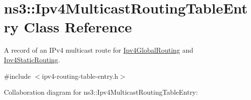 \hypertarget{classns3_1_1Ipv4MulticastRoutingTableEntry}{}\section{ns3\+:\+:Ipv4\+Multicast\+Routing\+Table\+Entry Class Reference}
\label{classns3_1_1Ipv4MulticastRoutingTableEntry}


A record of an I\+Pv4 multicast route for \hyperlink{classns3_1_1Ipv4GlobalRouting}{Ipv4\+Global\+Routing} and \hyperlink{classns3_1_1Ipv4StaticRouting}{Ipv4\+Static\+Routing}.  




{\ttfamily \#include $<$ipv4-\/routing-\/table-\/entry.\+h$>$}



Collaboration diagram for ns3\+:\+:Ipv4\+Multicast\+Routing\+Table\+Entry\+:
